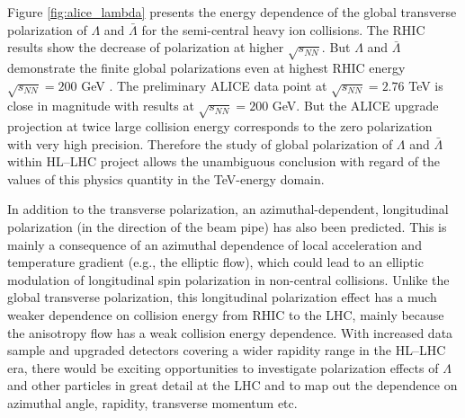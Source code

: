 Figure \ref{fig:alice_lambda} presents the energy dependence of the global transverse polarization of $\Lambda$ and $\bar{\Lambda}$ for the semi-central heavy ion collisions. The RHIC results show the decrease of polarization at higher $\sqrt{s_{NN}}$. But $\Lambda$ and $\bar{\Lambda}$ demonstrate the finite global polarizations even at highest RHIC energy $\sqrt{s_{NN}}=200$ GeV \cite{PRC-98-014910-2018}. The preliminary ALICE data point at $\sqrt{s_{NN}}=2.76$ TeV is close in magnitude with results at $\sqrt{s_{NN}}=200$ GeV. But the ALICE upgrade projection at twice large collision energy corresponds to the zero polarization with very high precision. Therefore the study of global polarization of $\Lambda$ and $\bar{\Lambda}$ within HL--LHC project allows the unambiguous conclusion with regard of the values of this physics quantity in the TeV-energy domain.    

In addition to the transverse polarization, an azimuthal-dependent, longitudinal polarization (in the direction of the beam pipe) has also been predicted. This is mainly a consequence of an azimuthal dependence of local acceleration and temperature gradient (e.g., the elliptic flow),
which could lead to an elliptic modulation of longitudinal spin polarization in non-central collisions. Unlike the global transverse polarization,
this longitudinal polarization effect has a much weaker dependence on collision energy from RHIC to the LHC\cite{Karpenko:2017dui}, mainly because the anisotropy flow has a weak collision energy dependence. With increased data sample and upgraded detectors covering a wider rapidity range in the HL--LHC era, there would be exciting opportunities to investigate polarization effects of $\Lambda$ and other particles in great detail at the LHC and to map out the dependence on azimuthal angle, rapidity, transverse momentum etc.

